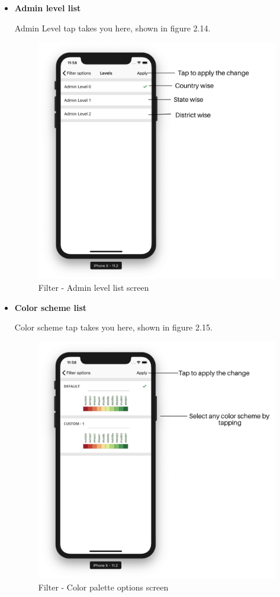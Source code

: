 \begin{itemize}
\begin{itemize}
        \item \textbf{Admin level list}
        
        Admin Level tap takes you here, shown in figure 2.14.
        
         \begin{figure}[H]
            \centering
            \includegraphics[width=0.50\linewidth]{figures/ch2/level_list.png}
            \caption{\label{fig:level_list_screen} Filter - Admin level list screen}
        \end{figure}

     \item \textbf{Color scheme list}
     
     Color scheme tap takes you here, shown in figure 2.15.
        
        \begin{figure}[H]
            \centering
            \includegraphics[width=0.50\linewidth]{figures/ch2/color_scheme.png}
            \caption{\label{fig:color_scheme} Filter - Color palette  options screen}
        \end{figure}
        
    \end{itemize}

\end{itemize}



